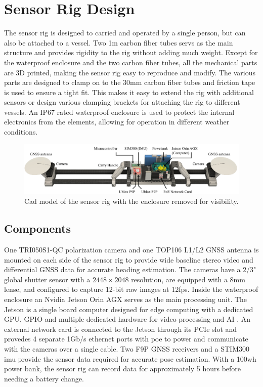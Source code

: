 \section{Sensor Rig Design}
The sensor rig is designed to carried and operated by a single person, but can also be attached to a vessel.
Two 1m carbon fiber tubes servs as the main structure and provides rigidity to the rig without adding much weight.
Except for the waterproof enclosure and the two carbon fiber tubes, all the mechanical parts are 3D printed, making the sensor rig easy to reproduce and modify.
The various parts are designed to clamp on to the 30mm carbon fiber tubes and friction tape is used to ensure a tight fit.
This makes it easy to extend the rig with additional sensors or design various clamping brackets for attaching the rig to different vessels.
An IP67 rated waterproof enclosure is used to protect the internal electronics from the elements, allowing for operation in different weather conditions.

\begin{figure}[H]
    \centering
    \includegraphics[width=\textwidth]{figures/rig_components.pdf}
    \caption{Cad model of the sensor rig with the enclosure removed for visibility.}
\end{figure}

\subsection{Components}
One TRI050S1-QC polarization camera and one TOP106 L1/L2 GNSS antenna is mounted on each side of the sensor rig to provide wide baseline stereo video and differential GNSS data for accurate heading estimation.
The cameras have a 2/3" global shutter sensor with a $2448\times2048$ resolution, are equipped with a 8mm lense, and configured to capture 12-bit raw images at 12fps.
Inside the waterproof enclosure an Nvidia Jetson Orin AGX serves as the main processing unit.
The Jetson is a single board computer designed for edge computing with a dedicated GPU, GPIO and multiple dedicated hardware for video processing and AI \cite{karumbunathanNVIDIAJetsonAGX2022}.
An external network card is connected to the Jetson through its PCIe slot and provedes 4 separate 1Gb/s ethernet ports with \gls{poe} to power and communicate with the cameras over a single cable.
Two F9P GNSS receivers and a STIM300 \gls{imu} provide the sensor data required for accurate pose estimation.
With a 100wh power bank, the sensor rig can record data for approximately 5 hours before needing a battery change.

